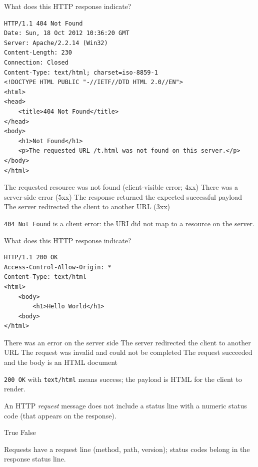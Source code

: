 \question[4]
What does this HTTP response indicate?
\begin{lstlisting}[style=http]
HTTP/1.1 404 Not Found
Date: Sun, 18 Oct 2012 10:36:20 GMT
Server: Apache/2.2.14 (Win32)
Content-Length: 230
Connection: Closed
Content-Type: text/html; charset=iso-8859-1
<!DOCTYPE HTML PUBLIC "-//IETF//DTD HTML 2.0//EN">
<html>
<head>
    <title>404 Not Found</title>
</head>
<body>
    <h1>Not Found</h1>
    <p>The requested URL /t.html was not found on this server.</p>
</body>
</html>
\end{lstlisting}
\begin{choices}
  \CorrectChoice The requested resource was not found (client-visible error; 4xx)
  \choice There was a server-side error (5xx)
  \choice The response returned the expected successful payload
  \choice The server redirected the client to another URL (3xx)
\end{choices}
\begin{solution}
  \texttt{404 Not Found} is a client error: the URI did not map to a resource on the server.
\end{solution}


\newpage

\question[4]
What does this HTTP response indicate?
\begin{lstlisting}[style=http]
HTTP/1.1 200 OK
Access-Control-Allow-Origin: *
Content-Type: text/html
<html>
    <body>
        <h1>Hello World</h1>
    <body>
</html>
\end{lstlisting}
\begin{choices}
  \choice There was an error on the server side
  \choice The server redirected the client to another URL
  \choice The request was invalid and could not be completed
  \CorrectChoice The request succeeded and the body is an HTML document
\end{choices}
\begin{solution}
  \texttt{200 OK} with \texttt{text/html} means success; the payload is HTML for the client to render.
\end{solution}

\question[4]
An HTTP \emph{request} message does not include a status line with a numeric status code (that appears on the response).
\begin{choices}
  \CorrectChoice True
  \choice False
\end{choices}
\begin{solution}
  Requests have a request line (method, path, version); status codes belong in the response status line.
\end{solution}



